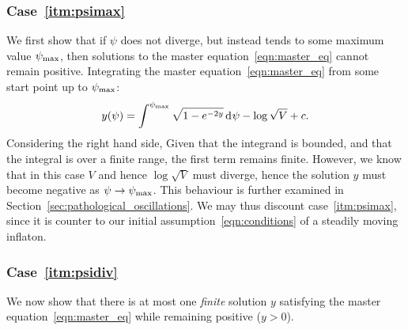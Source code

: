 \subsubsection{Case~\protect\ref{itm:psimax}}
We first show that if \(\psi\) does not diverge, but instead tends to some maximum value \(\psi_{\mathrm{max}}\), then solutions to the master equation~\eqref{eqn:master_eq} cannot remain positive. Integrating the master equation~\eqref{eqn:master_eq} from some start point up to \(\psi_{\mathrm{max}}\):
\begin{equation}
  y(\psi) = \int^{\psi_{\mathrm{max}}} \sqrt{1-e^{-2y}} \operatorname{d}^{}\!{\psi} - \log\sqrt{V} + c.
\end{equation}
Considering the right hand side, Given that the integrand is bounded, and that the integral is over a finite range, the first term remains finite. However, we know that in this case \(V\) and hence \(\log\sqrt V\) must diverge, hence the solution \(y\) must become negative as \(\psi\to\psi_{\mathrm{max}}\). This behaviour is further examined in Section~\ref{sec:pathological_oscillations}. We may thus discount case~\protect\ref{itm:psimax}, since it is counter to our initial assumption~\eqref{eqn:conditions} of a steadily moving inflaton.


\subsubsection{Case~\protect\ref{itm:psidiv}}
We now show that there is at most one {\em finite\/} solution \(y\) satisfying the master equation~\eqref{eqn:master_eq} while remaining positive (\(y>0\)).


